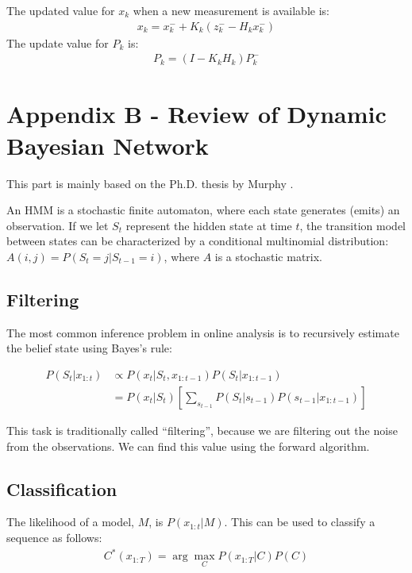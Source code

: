 The updated value for $x_k$ when a new measurement is available is:
\begin{align*}
x_k = x_k^- + K_k(z_k^- - H_kx_k^-)
\end{align*}
The update value for $P_k$ is:
\begin{align*}
P_k = (I - K_kH_k)P_k^-
\end{align*}

\section{Appendix B - Review of Dynamic Bayesian Network}
This part is mainly based on the Ph.D. thesis by Murphy \cite{murphy02}.

An HMM is a stochastic finite automaton, where each state generates (emits) an
observation. If we let $S_t$ represent the hidden state at time $t$, the
transition model between states can be characterized by a conditional
multinomial distribution: $A(i, j) = P(S_t = j | S_{t-1} = i)$, where $A$ is a
stochastic matrix.

\subsection{Filtering}
The most common inference problem in online analysis is to recursively estimate
the belief state using Bayes's rule:

\begin{align*}
P(S_t | x_{1:t}) & \propto P(x_t | S_t, x_{1:t-1})P(S_t | x_{1:t-1}) \\
 				 & = P(x_t | S_t) \left[\sum_{s_{t - 1}} 
				 	 P(S_t | s_{t - 1})P(s_{t - 1} | x_{1:t - 1})\right]	
\end{align*}

This task is traditionally called ``filtering'', because we are filtering out
the noise from the observations. We can find this value using the forward
algorithm.

\subsection{Classification}
The likelihood of a model, $M$, is $P(x_{1:t}|M)$. This can be used to classify
a sequence as follows:
\begin{align*}
C^*(x_{1:T}) = \arg \max_{C} P(x_{1:T} | C)P(C)
\end{align*}

